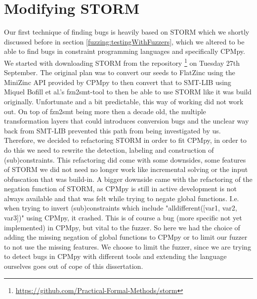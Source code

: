\section{Modifying STORM}
\label{impl:modifyingSTROM}
Our first technique of finding bugs is heavily based on STORM which we shortly discussed before in section \ref{fuzzing:testingWithFuzzers}, which we altered to be able to find bugs in constraint programming languages and specifically CPMpy. We started with downloading STORM from the repository \footnote{\url{https://github.com/Practical-Formal-Methods/storm}} on Tuesday 27th September.
The original plan was to convert our seeds to FlatZinc using the MiniZinc API provided by CPMpy to then convert that to SMT-LIB \cite{72bofill2010system} using Miquel Bofill et al.'s fzn2smt-tool to then be able to use STORM like it was build originally. Unfortunate and a bit predictable, this way of working did not work out. On top of fzn2smt being more then a decade old, the multiple transformation layers that could introduces conversion bugs and the unclear way back from SMT-LIB prevented this path from being investigated by us.
Therefore, we decided to refactoring STORM in order to fit CPMpy, in order to do this we need to rewrite the detection, labeling and construction of (sub)constraints. This refactoring did come with some downsides, some features of STORM we did not need no longer work like incremental solving or the input obfuscation that was build-in. A bigger downside came with the refactoring of the negation function of STORM, as CPMpy is still in active development is not always available and that was felt while trying to negate global functions. I.e. when trying to invert (sub)constraints which include "alldifferent([var1, var2, var3])" using CPMpy, it crashed. This is of course a bug (more specific not yet implemented) in CPMpy, but vital to the fuzzer. So here we had the choice of adding the missing negation of global functions to CPMpy or to limit our fuzzer to not use the missing features. We choose to limit the fuzzer, since we are trying to detect bugs in CPMpy with different tools and extending the language ourselves goes out of cope of this dissertation. 



